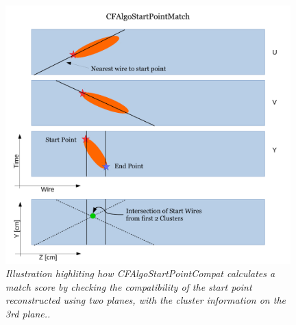 \documentclass{article}
\begin{document}
\begin{figure}[!h]
\begin{center}
\includegraphics[width=110mm]{Figures/MatchAglo_CFAlgoStartPointCompat_Description.pdf}
\end{center}
\caption{\textit{Illustration highliting how CFAlgoStartPointCompat calculates a match score by checking the compatibility of the start point
reconstructed using two planes, with the cluster information on the 3rd plane..}}
\label{fig:StartPointCompat.}
\end{figure}
\end{document}
